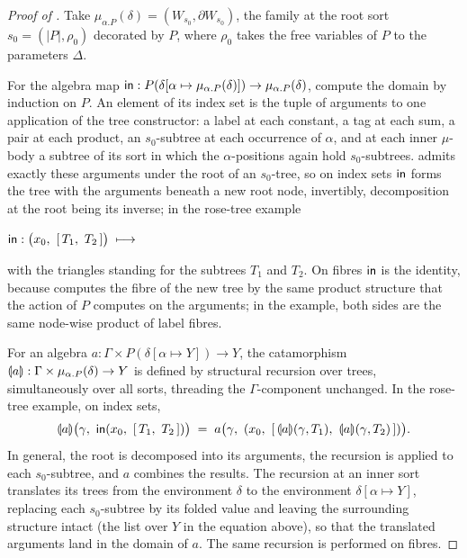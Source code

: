 \begin{proof}[Proof of ]
Take $\mu_{\alpha.P}(\delta) = (W_{s_0}, \partial W_{s_0})$, the family at the root sort $s_0 = (|P|,
\rho_0)$ decorated by $P$, where $\rho_0$ takes the free variables of $P$ to the parameters
$\Delta$.

For the algebra map $\mathsf{in} : P(\delta[\alpha \mapsto \mu_{\alpha.P}(\delta)]) \to
\mu_{\alpha.P}(\delta)$, compute the domain by induction on $P$. An element of its index set is the
tuple of arguments to one application of the tree constructor: a label at each constant, a tag at each sum,
a pair at each product, an $s_0$-subtree at each occurrence of $\alpha$, and at each inner
$\mu$-body a subtree of its sort in which the $\alpha$-positions again hold $s_0$-subtrees.
 admits exactly these arguments under the root of an $s_0$-tree, so
on index sets $\mathsf{in}$ forms the tree with the arguments beneath a new root node, invertibly,
decomposition at the root being its inverse; in the rose-tree example
\begin{center}
$\mathsf{in} : \bigl(x_0,\ [\,T_1,\ T_2\,]\bigr) \;\longmapsto\;$
\end{center}
\noindent
with the triangles standing for the subtrees $T_1$ and $T_2$. On fibres $\mathsf{in}$ is the identity,
because  computes the fibre of the new tree by the same product
structure that the action of $P$ computes on the arguments; in the example, both sides are the same node-wise
product of label fibres.

For an algebra $a : \Gamma \times P(\delta[\alpha \mapsto Y]) \to Y$, the catamorphism
$\llparenthesis a \rrparenthesis : \Gamma \times \mu_{\alpha.P}(\delta) \to Y$ is defined by structural recursion over
trees, simultaneously over all sorts, threading the $\Gamma$-component unchanged. In the rose-tree
example, on index sets,
\[
  \cata{a}\bigl(\gamma,\ \inMap(x_0,\ [\,T_1,\ T_2\,])\bigr) \;=\;
  a\bigl(\gamma,\ (x_0,\ [\,\cata{a}(\gamma, T_1),\ \cata{a}(\gamma, T_2)\,])\bigr).
\]
\noindent
In general, the root is decomposed into its arguments, the recursion is applied to each
$s_0$-subtree, and $a$ combines the results. The recursion at an inner sort translates its trees from
the environment $\delta$ to the environment $\delta[\alpha \mapsto Y]$, replacing each
$s_0$-subtree by its folded value and leaving the surrounding structure intact (the list over $Y$
in the equation above), so that the translated arguments land in the domain of $a$. The same recursion is
performed on fibres.


\end{proof}
